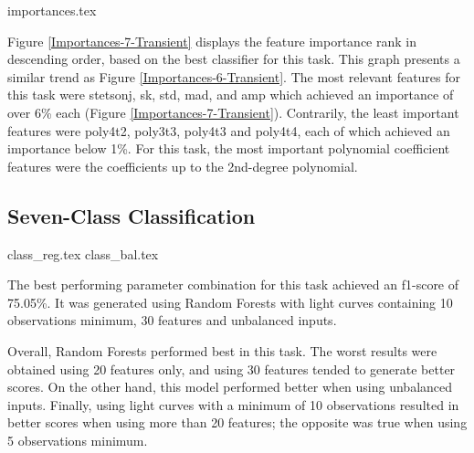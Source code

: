 \documentclass[a4paper,fleqn,usenatbib]{mnras}
\begin{document}


{importances.tex}

Figure \ref{Importances-7-Transient} displays the feature importance rank in descending order, based on the best classifier for this task. This graph presents a similar trend as Figure \ref{Importances-6-Transient}. The most relevant features for this task were stetson\textunderscore j, sk, std, mad, and amp which achieved an importance of over 6\% each (Figure \ref{Importances-7-Transient}). Contrarily, the least important features were poly4\textunderscore t2, poly3\textunderscore t3, poly4\textunderscore t3 and poly4\textunderscore t4, each of which achieved an importance below 1\%. For this task, the most important polynomial coefficient features were the coefficients up to the 2nd-degree polynomial. 



\subsection{Seven-Class Classification}

{class_reg.tex}
{class_bal.tex}

The best performing parameter combination for this task achieved an f1-score of 75.05\%. It was generated using Random Forests with light curves containing 10 observations minimum, 30 features and unbalanced inputs. 

Overall, Random Forests performed best in this task. The worst results were obtained using 20 features only, and using 30 features tended to generate better scores. On the other hand, this model performed better when using unbalanced inputs. Finally, using light curves with a minimum of 10 observations resulted in better scores when using more than 20 features; the opposite was true when using 5 observations minimum.
\end{document}
